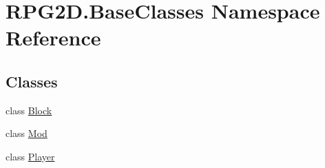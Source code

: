 \hypertarget{namespace_r_p_g2_d_1_1_base_classes}{}\section{R\+P\+G2\+D.\+Base\+Classes Namespace Reference}
\label{namespace_r_p_g2_d_1_1_base_classes}
\subsection*{Classes}
\begin{DoxyCompactItemize}
\item 
class \mbox{\hyperlink{class_r_p_g2_d_1_1_base_classes_1_1_block}{Block}}
\item 
class \mbox{\hyperlink{class_r_p_g2_d_1_1_base_classes_1_1_mod}{Mod}}
\item 
class \mbox{\hyperlink{class_r_p_g2_d_1_1_base_classes_1_1_player}{Player}}
\end{DoxyCompactItemize}
